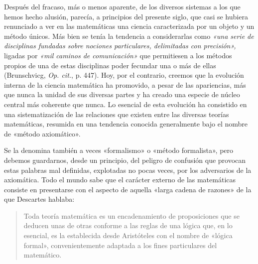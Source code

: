 \documentclass[a4paper, 12pt, draft]{article}
\begin{document}
Después del fracaso, más o menos aparente, de los diversos sistemas a los que hemos hecho alusión, parecía, a principios del presente siglo, que casi se hubiera renunciado a ver en las matemáticas una ciencia caracterizada por un objeto y un método únicos. Más bien se tenía la tendencia a considerarlas como \textit{«una serie de disciplinas fundadas sobre nociones particulares, delimitadas con precisión»,} ligadas por \textit{«mil caminos de comunicación»} que permitiesen a los métodos propios de una de estas disciplinas poder fecundar una o más de ellas (Brunschvicg, \textit{Op. cit.}, p. 447). Hoy, por el contrario, creemos que la evolución interna de la ciencia matemática ha promovido, a pesar de las apariencias, más que nunca la unidad de sus diversas partes y ha creado una especie de núcleo central más coherente que nunca. Lo esencial de esta evolución ha consistido en una sistematización de las relaciones que existen entre las diversas teorías matemáticas, resumida en una tendencia conocida generalmente bajo el nombre de «método axiomático».

Se la denomina también a veces «formalismo» o «método formalista», pero debemos guardarnos, desde un principio, del peligro de confusión que provocan estas palabras mal definidas, explotadas no pocas veces, por los adversarios de la axiomática. Todo el mundo sabe que el carácter externo de las matemáticas consiste en presentarse con el aspecto de aquella «larga cadena de razones» de la que Descartes hablaba: 

\begin{quote}

Toda teoría matemática es un encadenamiento de proposiciones que se deducen unas de otras conforme a las reglas de una lógica que, en lo esencial, es la establecida desde Aristóteles con el nombre de «lógica formal», convenientemente adaptada a los fines particulares del matemático.

\end{quote}
\end{document}
